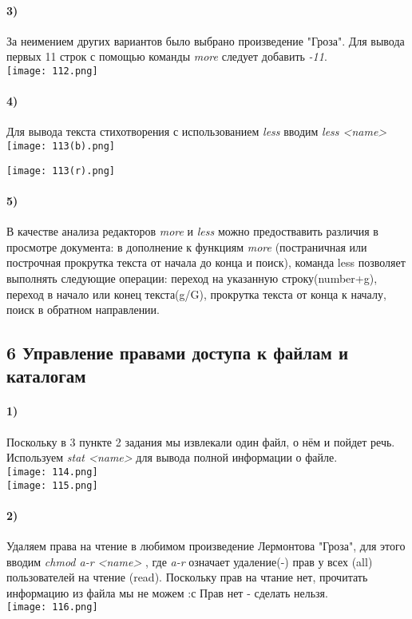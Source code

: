 		\paragraph{3)}
		За неимением других вариантов было выбрано произведение "Гроза". Для вывода 	первых 11 строк с помощью команды \textit{more} следует добавить \textit{-11}.
	\\
	\texttt{[image: 112.png]}
	\\
		\paragraph{4)}
		Для вывода текста стихотворения с использованием \textit{less} вводим 			\textit{less <name>}\\
	\texttt{[image: 113(b).png]}
	\\
	\begin{center}
		\texttt{[image: 113(r).png]}
	\end{center}
	
		\paragraph{5)}
		В качестве анализа редакторов \textit{more} и \textit{less} можно 				предоствавить различия в просмотре документа: в дополнение к функциям 				\textit{more}  (постраничная или построчная прокрутка текста от начала до конца 	и поиск), команда less позволяет выполнять следующие операции: переход на 			указанную строку(number+g), переход в начало или  конец текста(g/G), прокрутка 		текста от конца к началу, поиск в обратном направлении.\\
		
	\subsection*{6 Управление правами доступа к файлам и каталогам}
	
		\paragraph{1)}
		Поскольку в 3 пункте 2 задания мы извлекали один файл, о нём и пойдет речь. 	Используем \textit{stat <name>} для вывода полной информации о файле.\\
	\texttt{[image: 114.png]}
	\\
	\texttt{[image: 115.png]}
	\\
		\paragraph{2)}
		Удаляем права на чтение в любимом произведение Лермонтова "Гроза", для 			этого вводим \textit{chmod a-r <name> }, где \textit{a-r} означает удаление(-) 		прав у всех (all)  пользователей на чтение (read). Поскольку прав на чтание 		нет, прочитать информацию из файла мы не можем :с
	Прав нет - сделать нельзя.\\
	\texttt{[image: 116.png]}
	\\
